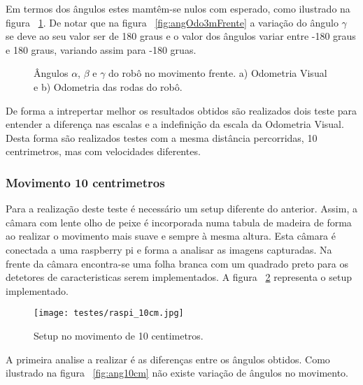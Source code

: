 Em termos dos ângulos estes mamtêm-se nulos com esperado, como ilustrado na figura ~\ref{fig:ang3mFrente}. De notar que na figura ~\ref{fig:angOdo3mFrente} a variação do ângulo $\gamma$ se deve ao seu valor ser de 180 graus e o valor dos ângulos variar entre -180 graus e 180 graus, variando assim para -180 gruas.

\begin{figure}[h!]
	\centering
	\qquad
	\caption{Ângulos $\alpha$, $\beta$ e $\gamma$ do robô no movimento frente. a) Odometria Visual e b) Odometria das rodas do robô.}
	\label{fig:ang3mFrente}
\end{figure}


De forma a intrepertar melhor os resultados obtidos são realizados dois teste para entender a diferença nas escalas e a indefinição da escala da Odometria Visual. Desta forma são realizados testes com a mesma distância percorridas, 10 centrimetros, mas com velocidades diferentes.


\subsubsection{Movimento 10 centrimetros}

Para a realização deste teste é necessário um setup diferente do anterior. Assim, a câmara com lente olho de peixe é incorporada numa tabula de madeira de forma ao realizar o movimento mais suave e sempre à mesma altura. Esta câmara é conectada a uma raspberry pi e forma a analisar as imagens capturadas. Na frente da câmara encontra-se uma folha branca com um quadrado preto para os detetores de caracteristicas serem implementados. A figura ~\ref{fig:setup10cm} representa o setup implementado.

\begin{figure}[h!]
	\begin{center}
		\leavevmode		
		\texttt{[image: testes/raspi\_10cm.jpg]}
		\caption{Setup no movimento de 10 centimetros.}
		\label{fig:setup10cm}
	\end{center}
\end{figure}
 


A primeira analise a realizar é as diferenças entre os ângulos obtidos. Como ilustrado na figura ~\ref{fig:ang10cm} não existe variação de ângulos no movimento.

